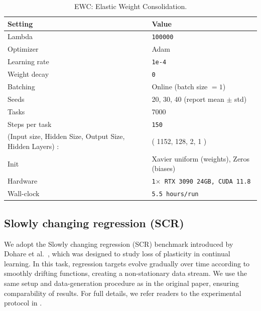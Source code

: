 \documentclass{article}
\begin{document}
\begin{table}[H]
\centering
\footnotesize
\caption{EWC: Elastic Weight Consolidation.}
\label{tab:split_image_net_cbp}
\begin{tabular}{@{}ll@{}}
\toprule
Setting & Value \\ \midrule
Lambda &\texttt{100000} \\
Optimizer & Adam  \\
Learning rate & \texttt{1e-4} \\
Weight decay & \texttt{0} \\
Batching & Online (batch size $=1$) \\
Seeds & 20, 30, 40 (report mean $\pm$ std) \\
Tasks & 7000 \\
Steps per task & \texttt{150} \\
(Input size, Hidden Size, Output Size, Hidden Layers) : & ( 1152, 128, 2, 1 ) \\ 
Init &  Xavier uniform (weights), Zeros (biases)\\
Hardware & \texttt{1$\times$ RTX 3090 24GB, CUDA 11.8} \\
Wall-clock & \texttt{5.5 hours/run} \\
\bottomrule
\end{tabular}
\end{table}


\clearpage

\subsection{Slowly changing regression (SCR)}
\label{sec:scr_setup}
We adopt the Slowly changing regression (SCR) benchmark introduced by Dohare et al.~\citep{dohare2024loss}, 
which was designed to study loss of plasticity in continual learning.  
In this task, regression targets evolve gradually over time according to smoothly drifting functions, 
creating a non-stationary data stream.  
We use the same setup and data-generation procedure as in the original paper, ensuring comparability of results.  
For full details, we refer readers to the experimental protocol in \citep{dohare2024loss}.
\end{document}

